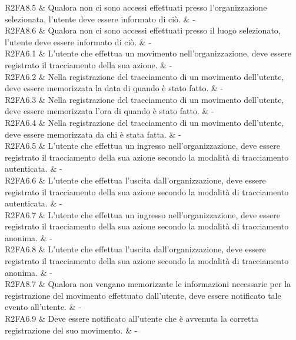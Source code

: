R2FA8.5 & Qualora non ci sono accessi effettuati presso l'organizzazione selezionata, l'utente deve essere informato di ciò. & - \\

R2FA8.6 & Qualora non ci sono accessi effettuati presso il luogo selezionato, l'utente deve essere informato di ciò.  & - \\

R2FA6.1 & L’utente che effettua un movimento nell’organizzazione, deve essere registrato il tracciamento della sua azione.  & - \\

R2FA6.2 & Nella registrazione del tracciamento di un movimento dell’utente, deve essere memorizzata la data di quando è stato fatto.  & - \\

R2FA6.3 & Nella registrazione del tracciamento di un movimento dell’utente, deve essere memorizzata l’ora di quando è stato fatto.  & - \\

R2FA6.4 & Nella registrazione del tracciamento di un movimento dell’utente, deve essere memorizzata da chi è stata fatta.  & - \\

R2FA6.5 & L’utente che effettua un ingresso nell’organizzazione, deve essere registrato il tracciamento della sua azione secondo la modalità di tracciamento autenticata.  & - \\

R2FA6.6 & L’utente che effettua l’uscita dall’organizzazione, deve essere registrato il tracciamento della sua azione secondo la modalità di tracciamento autenticata.  & - \\

R2FA6.7 & L’utente che effettua un ingresso nell’organizzazione, deve essere registrato il tracciamento della sua azione secondo la modalità di tracciamento anonima.  & - \\

R2FA6.8 & L’utente che effettua l’uscita dall’organizzazione, deve essere registrato il tracciamento della sua azione secondo la modalità di tracciamento anonima.  & - \\

R2FA8.7 & Qualora non vengano memorizzate le informazioni necessarie per la registrazione del movimento effettuato dall’utente, deve essere notificato tale evento all’utente.  & - \\

R2FA6.9 & Deve essere notificato all’utente che è avvenuta la corretta registrazione del suo movimento.  & - \\


